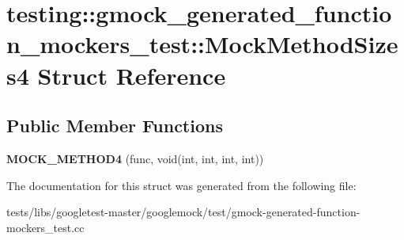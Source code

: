 \hypertarget{structtesting_1_1gmock__generated__function__mockers__test_1_1MockMethodSizes4}{}\section{testing\+:\+:gmock\+\_\+generated\+\_\+function\+\_\+mockers\+\_\+test\+:\+:Mock\+Method\+Sizes4 Struct Reference}
\label{structtesting_1_1gmock__generated__function__mockers__test_1_1MockMethodSizes4}
\subsection*{Public Member Functions}
\begin{DoxyCompactItemize}
\item 
\mbox{\label{structtesting_1_1gmock__generated__function__mockers__test_1_1MockMethodSizes4_a140f1bc5124d32b763913f5f64fe3502}} 
{\bfseries M\+O\+C\+K\+\_\+\+M\+E\+T\+H\+O\+D4} (func, void(int, int, int, int))
\end{DoxyCompactItemize}


The documentation for this struct was generated from the following file\+:\begin{DoxyCompactItemize}
\item 
tests/libs/googletest-\/master/googlemock/test/gmock-\/generated-\/function-\/mockers\+\_\+test.\+cc\end{DoxyCompactItemize}
